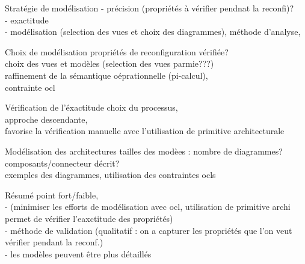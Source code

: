 \begin{frame}{Stratégie de modélisation}
- précision (propriétés à vérifier pendnat la reconfi)?\\ 
- exactitude \\
- modélisation (selection des vues et 
choix des diagrammes),
méthode d'analyse,    
\end{frame}

\begin{frame}{Choix de modélisation}
propriétés de reconfiguration vérifiée?\\
choix des vues et modèles
(selection des vues parmie???)\\
raffinement de la sémantique oéprationnelle (pi-calcul), \\
contrainte ocl
\end{frame}

\begin{frame}{Vérification de l'éxactitude}
choix du processus,\\
approche descendante, \\
favorise la vérification manuelle avec l'utilisation 
de primitive architecturale
\end{frame}

\begin{frame}{Modélisation des architectures}
tailles des modèes : nombre de diagrammes? composants/connecteur décrit?\\
exemples des diagrammes, utilisation des contraintes ocls
\end{frame}

\begin{frame}{Résumé}
point fort/faible,\\
- (minimiser les efforts de modélisation avec ocl, 
utilisation de primitive archi permet de vérifier l'eaxctitude des propriétés)\\
- méthode de validation (qualitatif : on a capturer les propriétés que l'on veut vérifier pendant la reconf.)\\
- les modèles peuvent être plus détaillés\\
\end{frame}